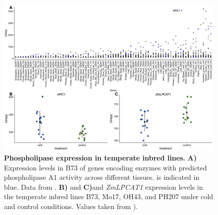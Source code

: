 \begin{figure}[t]
\begin{center}
\includegraphics[width=\linewidth]{Sup_Figures/Sup_Fig_4.png}
\caption[Phospholipase expression in temperate inbred lines.]{\textbf{Phospholipase expression in temperate inbred lines.} \textbf{A)} Expression levels in B73 of genes encoding enzymes with predicted phospholipase A1 activity across different tissues. \hpc is indicated in blue. 
Data from \cite{stelpflug2016-vr}.
\textbf{B)}  and \textbf{C)}\hpc and \textit{ZmLPCAT1} expression levels in the temperate inbred lines B73, Mo17, OH43, and PH207 under cold and control conditions. Values taken from \cite{waters2017-nat}).
}
\label{figure:Sup:B73_expression}
\end{center}
\end{figure} 
\clearpage


